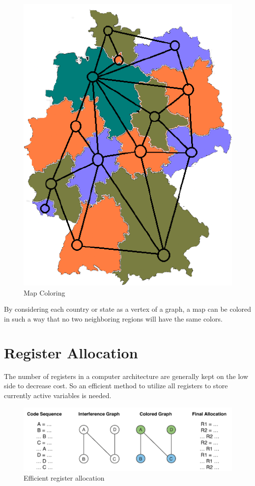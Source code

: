 \documentclass[14pt]{extreport}
\begin{document}
    		\begin{figure}[h]
    		    \centering
    			\includegraphics[scale=0.5]{diagrams/maps.png}
    			  \caption{Map Coloring}
    			\label{fig:maps}
    		\end{figure}
    		
    		By considering each country or state as a vertex of a graph, a map can be colored in such a way that no two neighboring regions will have the same colors.
    		
    		\pagebreak
    		
    		
    	\section{Register Allocation}
    	   \vspace{20pt}
    	    The number of registers in a computer architecture are generally kept on the low side to decrease cost. So an efficient method to utilize all registers to store currently active variables is needed. 
    		\begin{figure}[ht]
    			
    			\includegraphics[scale=1.0]{diagrams/register_cropped.png}
    			  \caption{Efficient register allocation}
    			\label{fig:regs}
    		\end{figure}
    		\vspace{1cm}
    		
\end{document}
